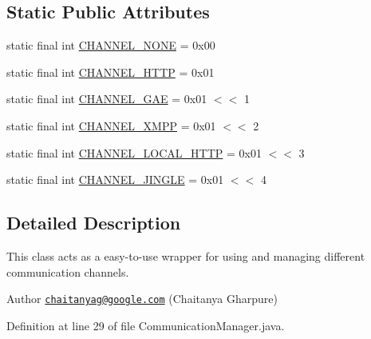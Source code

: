 \subsection*{Static Public Attributes}
\begin{DoxyCompactItemize}
\item 
static final int \hyperlink{classcom_1_1cellbots_1_1communication_1_1_communication_manager_ae97b5a5fc1d236a007c443c8fd62439e}{C\-H\-A\-N\-N\-E\-L\-\_\-\-N\-O\-N\-E} = 0x00
\item 
static final int \hyperlink{classcom_1_1cellbots_1_1communication_1_1_communication_manager_a050372ed3661baedb8e8811b3c172121}{C\-H\-A\-N\-N\-E\-L\-\_\-\-H\-T\-T\-P} = 0x01
\item 
static final int \hyperlink{classcom_1_1cellbots_1_1communication_1_1_communication_manager_af99bd8872667d307699cf6ca751a995a}{C\-H\-A\-N\-N\-E\-L\-\_\-\-G\-A\-E} = 0x01 $<$$<$ 1
\item 
static final int \hyperlink{classcom_1_1cellbots_1_1communication_1_1_communication_manager_a4d449547286440b770e3e66514070702}{C\-H\-A\-N\-N\-E\-L\-\_\-\-X\-M\-P\-P} = 0x01 $<$$<$ 2
\item 
static final int \hyperlink{classcom_1_1cellbots_1_1communication_1_1_communication_manager_a4c0351c4b77785eae3d4bb1c03c95d9f}{C\-H\-A\-N\-N\-E\-L\-\_\-\-L\-O\-C\-A\-L\-\_\-\-H\-T\-T\-P} = 0x01 $<$$<$ 3
\item 
static final int \hyperlink{classcom_1_1cellbots_1_1communication_1_1_communication_manager_a071fba74dfd65ee14b059f3789beb05a}{C\-H\-A\-N\-N\-E\-L\-\_\-\-J\-I\-N\-G\-L\-E} = 0x01 $<$$<$ 4
\end{DoxyCompactItemize}


\subsection{Detailed Description}
This class acts as a easy-\/to-\/use wrapper for using and managing different communication channels.

\begin{DoxyAuthor}{Author}
\href{mailto:chaitanyag@google.com}{\tt chaitanyag@google.\-com} (Chaitanya Gharpure) 
\end{DoxyAuthor}


Definition at line 29 of file Communication\-Manager.\-java.



